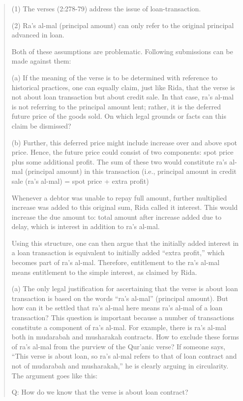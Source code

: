 \begin{quote}
(1) The verses (2:278-79) address the issue of loan-transaction.

(2) Ra's al-mal (principal amount) can only refer to the original principal advanced in loan.

Both of these assumptions are problematic. Following submissions can be made against them:

(a) If the meaning of the verse is to be determined with reference to historical practices, one can equally claim, just like Rida, that the verse is not about loan transaction but about credit sale. In that case, ra's al-mal is not referring to the principal amount lent; rather, it is the deferred future price of the goods sold. On which legal grounds or facts can this claim be dismissed?

(b) Further, this deferred price might include increase over and above spot price. Hence, the future price could consist of two components: spot price plus some additional profit. The sum of these two would constitute ra's al-mal (principal amount) in this transaction (i.e., principal amount in credit sale (ra's al-mal) = spot price + extra profit)

Whenever a debtor was unable to repay full amount, further multiplied increase was added to this original sum, Rida called it interest. This would increase the due amount to: total amount after increase added due to delay, which is interest in addition to ra's al-mal.

Using this structure, one can then argue that the initially added interest in a loan transaction is equivalent to initially added “extra profit,” which becomes part of ra's al-mal. Therefore, entitlement to the ra's al-mal means entitlement to the simple interest, as claimed by Rida.

(a) The only legal justification for ascertaining that the verse is about loan transaction is based on the words “ra's al-mal” (principal amount). But how can it be settled that ra's al-mal here means ra's al-mal of a loan transaction? This question is important because a number of transactions constitute a component of ra's al-mal. For example, there is ra's al-mal both in mudarabah and musharakah contracts. How to exclude these forms of ra's al-mal from the purview of the Qur'anic verse? If someone says, “This verse is about loan, so ra's al-mal refers to that of loan contract and not of mudarabah and musharakah,” he is clearly arguing in circularity. The argument goes like this:

Q: How do we know that the verse is about loan contract?


\end{quote}

